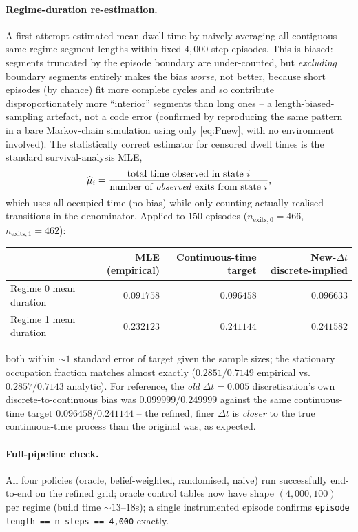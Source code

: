 \documentclass[11pt]{article}
\begin{document}
\paragraph{Regime-duration re-estimation.} A first attempt estimated mean dwell time by naively averaging all contiguous same-regime segment lengths within fixed $4{,}000$-step episodes. This is biased: segments truncated by the episode boundary are under-counted, but \emph{excluding} boundary segments entirely makes the bias \emph{worse}, not better, because short episodes (by chance) fit more complete cycles and so contribute disproportionately more ``interior'' segments than long ones -- a length-biased-sampling artefact, not a code error (confirmed by reproducing the same pattern in a bare Markov-chain simulation using only \eqref{eq:Pnew}, with no environment involved). The statistically correct estimator for censored dwell times is the standard survival-analysis MLE,
\begin{equation}
\widehat{\mu}_i = \frac{\text{total time observed in state } i}{\text{number of \emph{observed} exits from state } i},
\end{equation}
which uses all occupied time (no bias) while only counting actually-realised transitions in the denominator. Applied to $150$ episodes ($n_{\text{exits},0}=466$, $n_{\text{exits},1}=462$):
\begin{center}
\begin{tabular}{@{}lrrr@{}}
\toprule
& MLE (empirical) & Continuous-time target & New-$\Delta t$ discrete-implied \\
\midrule
Regime 0 mean duration & $0.091758$ & $0.096458$ & $0.096633$ \\
Regime 1 mean duration & $0.232123$ & $0.241144$ & $0.241582$ \\
\bottomrule
\end{tabular}
\end{center}
both within $\sim\!1$ standard error of target given the sample sizes; the stationary occupation fraction matches almost exactly ($0.2851/0.7149$ empirical vs.\ $0.2857/0.7143$ analytic). For reference, the \emph{old} $\Delta t=0.005$ discretisation's own discrete-to-continuous bias was $0.099999/0.249999$ against the same continuous-time target $0.096458/0.241144$ -- the refined, finer $\Delta t$ is \emph{closer} to the true continuous-time process than the original was, as expected.

\paragraph{Full-pipeline check.} All four policies (oracle, belief-weighted, randomised, naive) run successfully end-to-end on the refined grid; oracle control tables now have shape $(4{,}000, 100)$ per regime (build time $\sim\!13$--$18$s); a single instrumented episode confirms \texttt{episode length == n\_steps == 4{,}000} exactly.
\end{document}

